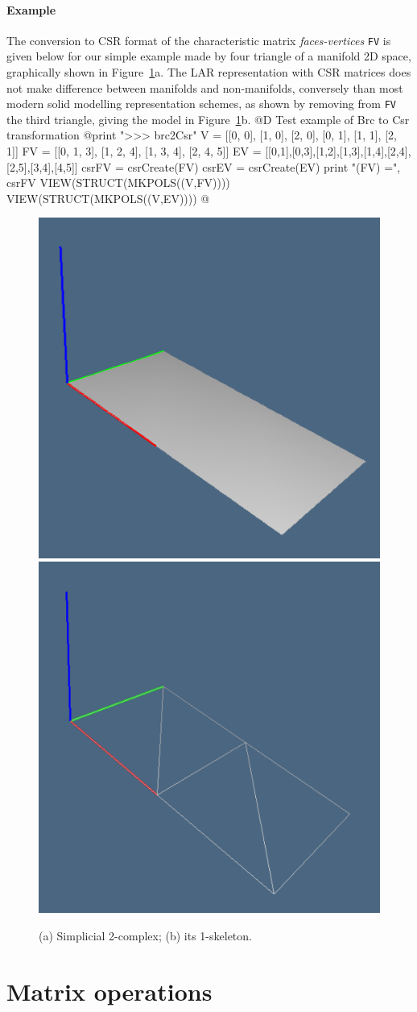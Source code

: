 \documentclass[11pt,oneside]{article}	%
\begin{document}
\paragraph{Example}
The conversion to CSR format of the characteristic matrix \emph{faces-vertices} \texttt{FV} is given below for our simple example made by four triangle of a manifold 2D space, graphically shown in Figure~\ref{fig:2D-non-manifold}a. The LAR representation with CSR matrices does not make difference between manifolds and non-manifolds, conversely than most modern solid modelling representation schemes, as shown by removing from \texttt{FV} the third triangle, giving the model in Figure~\ref{fig:2D-non-manifold}b.
@D Test example of Brc to Csr transformation
@{print "\n>>> brc2Csr"
V = [[0, 0], [1, 0], [2, 0], [0, 1], [1, 1], [2, 1]]
FV = [[0, 1, 3], [1, 2, 4], [1, 3, 4], [2, 4, 5]]
EV = [[0,1],[0,3],[1,2],[1,3],[1,4],[2,4],[2,5],[3,4],[4,5]]
csrFV = csrCreate(FV)
csrEV = csrCreate(EV)
print "\ncsrCreate(FV) =\n", csrFV
VIEW(STRUCT(MKPOLS((V,FV))))
VIEW(STRUCT(MKPOLS((V,EV))))
@}

\begin{figure}[htbp] %
   \centering
   \includegraphics[height=0.25\linewidth,width=0.25\linewidth]{images/larcc1a} 
   \includegraphics[height=0.25\linewidth,width=0.25\linewidth]{images/larcc1b} 
   \caption{(a) Simplicial 2-complex; (b) its 1-skeleton.}
   \label{fig:2D-non-manifold}
\end{figure}

\section{Matrix operations}
\end{document}
